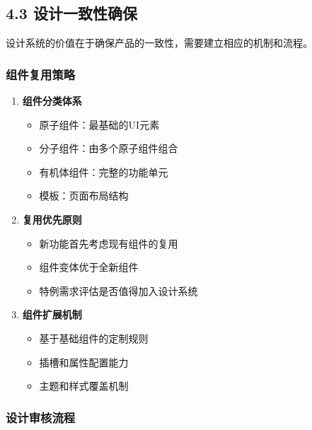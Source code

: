 \subsection{4.3
设计一致性确保}\label{ux8bbeux8ba1ux4e00ux81f4ux6027ux786eux4fdd}

设计系统的价值在于确保产品的一致性，需要建立相应的机制和流程。

\subsubsection{组件复用策略}\label{ux7ec4ux4ef6ux590dux7528ux7b56ux7565}

\begin{enumerate}
\def\labelenumi{\arabic{enumi}.}
\tightlist
\item
  \textbf{组件分类体系}

  \begin{itemize}
  \tightlist
  \item
    原子组件：最基础的UI元素
  \item
    分子组件：由多个原子组件组合
  \item
    有机体组件：完整的功能单元
  \item
    模板：页面布局结构
  \end{itemize}
\item
  \textbf{复用优先原则}

  \begin{itemize}
  \tightlist
  \item
    新功能首先考虑现有组件的复用
  \item
    组件变体优于全新组件
  \item
    特例需求评估是否值得加入设计系统
  \end{itemize}
\item
  \textbf{组件扩展机制}

  \begin{itemize}
  \tightlist
  \item
    基于基础组件的定制规则
  \item
    插槽和属性配置能力
  \item
    主题和样式覆盖机制
  \end{itemize}
\end{enumerate}

\subsubsection{设计审核流程}\label{ux8bbeux8ba1ux5ba1ux6838ux6d41ux7a0b}

